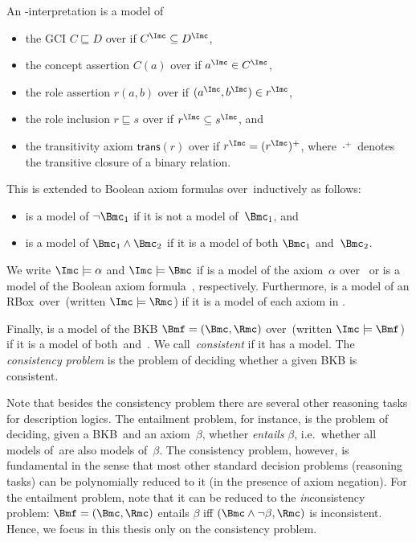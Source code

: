 \begin{definition}
  \label{def:semantics-of-axioms}
  An \Nsig-interpretation \I is a model of
  \begin{itemize}
  \item the GCI $C \sqsubseteq D$ over \Nsig if $C^{\I} \subseteq D^{\I}$,
  \item the concept assertion $C(a)$ over \Nsig if $a^{\I} \in C^{\I}$,
  \item the role assertion $r(a,b)$ over \Nsig if $(a^\I,b^\I)\in r^\I$,
  \item the role inclusion $r \sqsubseteq s$ over \Nsig if $r^\I \subseteq s^\I$, and
  \item the transitivity axiom $\mathsf{trans}(r)$ over \Nsig if $r^\I=(r^\I)^+$, where $\cdot^{+}$
    denotes the transitive closure of a binary relation.
  \end{itemize}

  This is extended to Boolean axiom formulas over~\Nsig inductively as follows:
  \begin{itemize}
  \item \I is a model of $\lnot\B_1$ if it is not a model of~$\B_1$, and
  \item \I is a model of $\B_1\land\B_2$ if it is a model of both $\B_1$ and~$\B_2$.
  \end{itemize}

  We write $\I\models\alpha$ and $\I\models\Bmc$ if \I is a model of the axiom~$\alpha$ over~\Nsig
  or \I is a model of the Boolean axiom formula~\B, respectively. Furthermore, \I is a model of an
  RBox~\Rmc over~\Nsig (written $\I\models\Rmc$) if it is a model of each axiom in \Rmc.

  Finally, \I is a model of the BKB $\Bmf=(\B,\Rmc)$ over~\Nsig (written $\I\models\Bmf$) if it is a
  model of both~\B and~\Rmc.  We call~\Bmf \emph{consistent} if it has a model.  The
  \emph{consistency problem} is the problem of deciding whether a given BKB is consistent.
\end{definition}

Note that besides the consistency problem there are several other reasoning tasks for description
logics.  The entailment problem, for instance, is the problem of deciding, given a BKB~\Bmf and an
axiom~$\beta$, whether \Bmf \emph{entails} $\beta$, i.e.~whether all models of~\Bmf are also models
of~$\beta$.
%
The consistency problem, however, is fundamental in the sense that most other standard decision
problems (reasoning tasks) can be polynomially reduced to it (in the presence of axiom negation).
For the entailment problem, note that it can be reduced to the \emph{in}consistency problem: $\Bmf=(\B,\Rmc)$
entails $\beta$ iff $(\B\land\lnot\beta,\Rmc)$ is inconsistent.  Hence, we focus in this thesis only
on the consistency problem.

